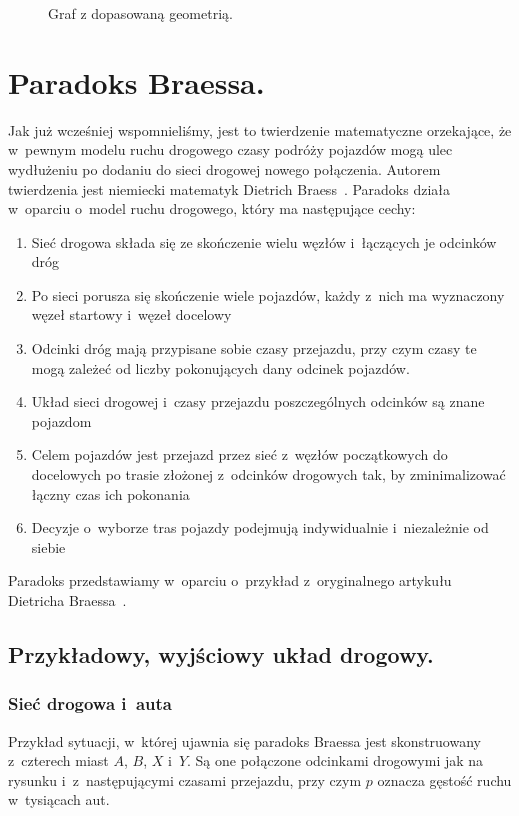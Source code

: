 \documentclass[twoside,12pt]{report}
\begin{document}
\begin{figure}[ht]
\begin{flushright}
\begin{minipage}[]{.45\textwidth}
	\caption{Graf z dopasowaną geometrią.}
	\label{right-ex}
	\end{minipage}
\end{flushright}
\end{figure}

\clearpage
\section{Paradoks Braessa.}

Jak już wcześniej wspomnieliśmy, jest to twierdzenie matematyczne orzekające, że w~pewnym modelu ruchu drogowego czasy podróży pojazdów mogą ulec wydłużeniu po dodaniu do sieci drogowej nowego połączenia. Autorem twierdzenia jest niemiecki matematyk Dietrich Braess~\cite{braess}. Paradoks działa w~oparciu o~model ruchu drogowego, który ma następujące cechy:

\begin{enumerate}
\item Sieć drogowa składa się ze skończenie wielu węzłów i~łączących je odcinków dróg
\item Po sieci porusza się skończenie wiele pojazdów, każdy z~nich ma wyznaczony węzeł startowy i~węzeł docelowy
\item Odcinki dróg mają przypisane sobie czasy przejazdu, przy czym czasy te mogą zależeć od liczby pokonujących dany odcinek pojazdów.
\item Układ sieci drogowej i~czasy przejazdu poszczególnych odcinków są znane pojazdom
\item Celem pojazdów jest przejazd przez sieć z~węzłów początkowych do docelowych po trasie złożonej z~odcinków drogowych tak, by zminimalizować łączny czas ich pokonania
\item Decyzje o~wyborze tras pojazdy podejmują indywidualnie i~niezależnie od siebie
\end{enumerate}
Paradoks przedstawiamy w~oparciu o~przykład z~oryginalnego artykułu Dietricha Braessa~\cite{paradox}.

\subsection{Przykładowy, wyjściowy układ drogowy.}
\subsubsection{Sieć drogowa i~auta}

Przykład sytuacji, w~której ujawnia się paradoks Braessa jest skonstruowany z~czterech miast $A$, $B$, $X$ i~$Y$. Są one połączone odcinkami drogowymi jak na rysunku i~z~następującymi czasami przejazdu, przy czym $p$ oznacza gęstość ruchu w~tysiącach aut.
\end{document}

